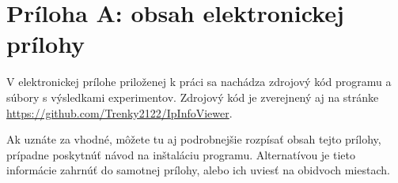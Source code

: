 \chapter*{Príloha A: obsah elektronickej prílohy}

V elektronickej prílohe priloženej k práci sa nachádza zdrojový kód
programu a súbory s výsledkami experimentov. Zdrojový kód je
zverejnený aj na stránke \url{https://github.com/Trenky2122/IpInfoViewer}.

Ak uznáte za vhodné, môžete tu aj podrobnejšie rozpísať obsah tejto
prílohy, prípadne poskytnúť návod na inštaláciu programu. Alternatívou
je tieto informácie zahrnúť do samotnej prílohy, alebo ich uviesť na
obidvoch miestach.

